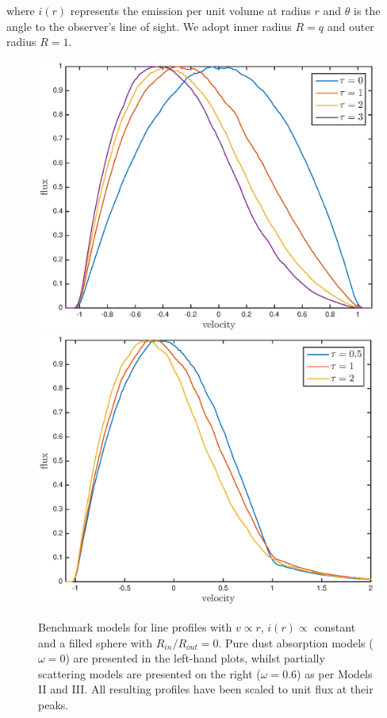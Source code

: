 \documentclass[useAMS,usenatbib,usegraphicx]{mnras}
\begin{document}
\noindent where $i(r)$ represents the emission per unit volume at radius 
$r$ and $\theta$ is the angle to the observer's line of sight.  We adopt inner radius $R=q$ and outer radius $R=1$.

\begin{figure}
\includegraphics[trim =37 10 45 15,clip=true,scale=0.51]{params/opt_thick_w0} 
\includegraphics[trim =37 10 45 15,clip=true,scale=0.51]{params/opt_thick_w0_6}  
\caption{Benchmark models for line profiles  with $v \propto r$, $i(r) \propto$ constant and a filled sphere with $R_{in}/R_{out}=0$.  Pure dust absorption models ($\omega = 0$) are presented in the left-hand plots, whilst partially scattering models are presented on the right ($\omega = 0.6$) as per \citet{Lucy1989} Models II and III. All resulting profiles have been scaled to unit flux at their peaks.}
\label{fig:Lucy}
\end{figure}
\end{document}
